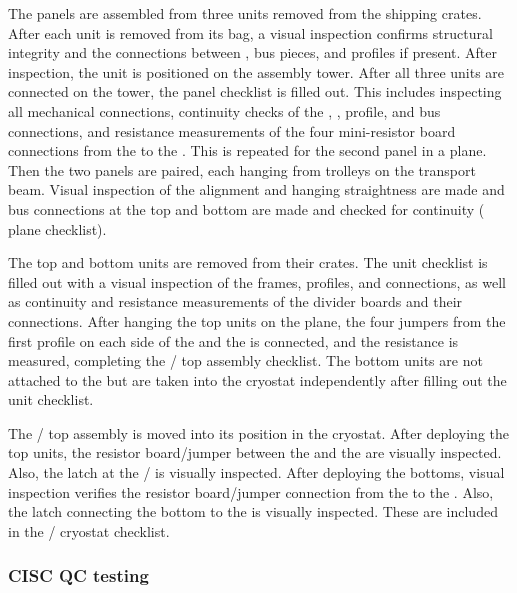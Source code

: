 The  panels are assembled from three units removed from the shipping crates.  
After each unit is removed from its bag, a visual inspection confirms structural integrity and the connections between ,  bus pieces, and profiles if present.  
After inspection, the unit is positioned on the  assembly tower.  
After all three units are connected on the tower, the  panel checklist is filled out.  
This includes inspecting all mechanical connections, continuity checks of the , , profile, and  bus connections, and resistance measurements of the four mini-resistor board connections from the  to the .  
This is repeated for the second panel in a  plane.  Then the two panels are paired, each hanging from trolleys on the transport beam.  
Visual inspection of the alignment and hanging straightness are made and  bus connections at the top and bottom are made and checked for continuity ( plane checklist).

The  top and bottom units are removed from their crates.  The  unit checklist is filled out with a visual inspection of the frames, profiles, and connections, as well as continuity and resistance measurements of the divider boards and their connections.  
After hanging the top  units on the  plane, the four jumpers from the first  profile on each side of the  and the   is connected, and the resistance is measured, completing the / top assembly checklist. 
The  bottom units are not attached to the  but are taken into the cryostat independently after filling out the  unit checklist.

The / top assembly is moved into its position in the cryostat.   
After deploying the  top units, the resistor board/jumper between the  and the   are visually inspected.  
Also, the latch at the / is visually inspected.  After deploying the  bottoms, visual inspection verifies the resistor board/jumper connection from the  to the .  
Also, the latch connecting the  bottom to the  is visually inspected.  
These are included in the / cryostat checklist.



\subsubsection{CISC QC testing}

